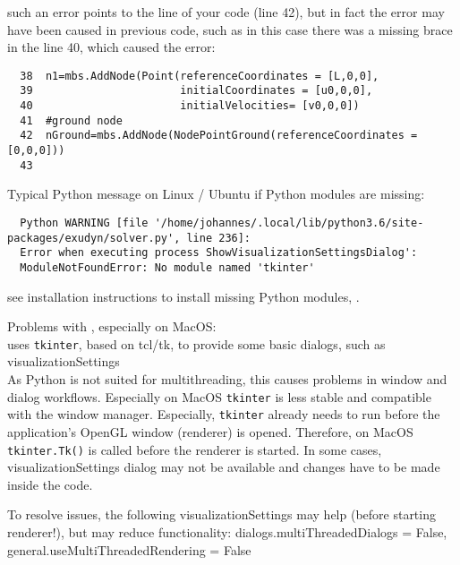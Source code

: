 \onlyRST{\rstStartNewLine}
%
\item[$\ra$] such an error points to the line of your code (line 42), but in fact the error may have been caused in previous code, such as in this case there was a missing brace in the line 40, which caused the error:
\pythonstyle\begin{lstlisting}
  38  n1=mbs.AddNode(Point(referenceCoordinates = [L,0,0],
  39                       initialCoordinates = [u0,0,0],
  40                       initialVelocities= [v0,0,0])
  41  #ground node
  42  nGround=mbs.AddNode(NodePointGround(referenceCoordinates = [0,0,0]))
  43  
\end{lstlisting}
%
%
\item Typical Python  message on Linux / Ubuntu if Python modules are missing:
\plainlststyle
\begin{lstlisting}
  Python WARNING [file '/home/johannes/.local/lib/python3.6/site-packages/exudyn/solver.py', line 236]: 
  Error when executing process ShowVisualizationSettingsDialog':
  ModuleNotFoundError: No module named 'tkinter'
\end{lstlisting}
\onlyRST{\rstStartNewLine}
%
\item[$\ra$] see installation instructions to install missing Python modules, .

\item Problems with , especially on MacOS:\\
  \codeName uses \texttt{tkinter}, based on tcl/tk, to provide some basic dialogs, such as visualizationSettings\\
  As Python is not suited for multithreading, this causes problems in window and dialog workflows. Especially on MacOS
  \texttt{tkinter} is less stable and compatible with the window manager. Especially, \texttt{tkinter} already needs to run
  before the application's OpenGL window (renderer) is opened. Therefore, on MacOS \texttt{tkinter.Tk()} is called before the 
  renderer is started.
  In some cases, visualizationSettings dialog may not be available and changes have to be made inside the code.
  
\item[$\ra$] To resolve issues, the following visualizationSettings may help (before starting renderer!), but may reduce functionality: 
     dialogs.multiThreadedDialogs = False, general.useMultiThreadedRendering = False
\ei 



